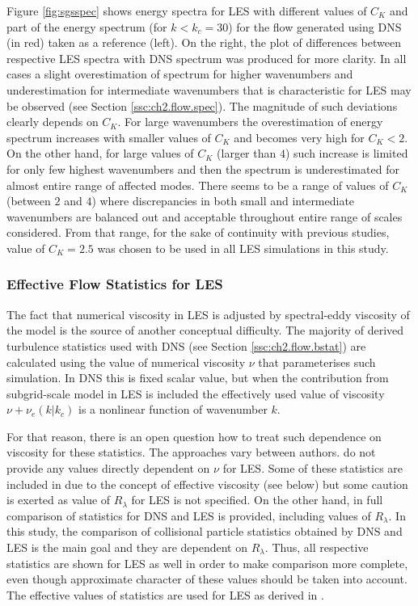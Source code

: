 \documentclass{pracamgren}
\begin{document}
Figure \ref{fig:sgsspec} shows energy spectra for LES with different values of $C_K$ and part of the energy spectrum (for $k < k_c = 30$) for the flow generated using DNS (in red) taken as a reference (left).
On the right, the plot of differences between respective LES spectra with DNS spectrum was produced for more clarity.
In all cases a slight overestimation of spectrum for higher wavenumbers and underestimation for intermediate wavenumbers that is characteristic for LES may be observed (see Section \ref{ssc:ch2.flow.spec}).
The magnitude of such deviations clearly depends on $C_K$.
For large wavenumbers the overestimation of energy spectrum increases with smaller values of $C_K$ and becomes very high for $C_K < 2$.
On the other hand, for large values of $C_K$ (larger than $4$) such increase is limited for only few highest wavenumbers and then the spectrum is underestimated for almost entire range of affected modes.
There seems to be a range of values of $C_K$ (between $2$ and $4$) where discrepancies in both small and intermediate wavenumbers are balanced out and acceptable throughout entire range of scales considered.
From that range, for the sake of continuity with previous studies, value of $C_K=2.5$ was chosen to be used in all LES simulations in this study.


\subsubsection{Effective Flow Statistics for LES}

The fact that numerical viscosity in LES is adjusted by spectral-eddy viscosity of the model is the source of another conceptual difficulty.
The majority of derived turbulence statistics used with DNS (see Section \ref{ssc:ch2.flow.bstat}) are calculated using the value of numerical viscosity $\nu$ that parameterises such simulation.
In DNS this is fixed scalar value, but when the contribution from subgrid-scale model in LES is included the effectively used value of viscosity $\nu + \nu_{e}(k|k_c)$ is a nonlinear function of wavenumber $k$.

For that reason, there is an open question how to treat such dependence on viscosity for these statistics.
The approaches vary between authors.
\textcite[Table 1 therein]{Yang2008} do not provide any values directly dependent on $\nu$ for LES.
Some of these statistics are included in \textcite[Table 1 therein]{Jin2010} due to the concept of effective viscosity (see below) but some caution is exerted as value of $R_{\lambda}$ for LES is not specified.
On the other hand, in \textcite[Table 1 therein]{Rosa2017} full comparison of statistics for DNS and LES is provided, including values of $R_{\lambda}$.
In this study, the comparison of collisional particle statistics obtained by DNS and LES is the main goal and they are dependent on $R_{\lambda}$.
Thus, all respective statistics are shown for LES as well in order to make comparison more complete, even though approximate character of these values should be taken into account.
The effective values of statistics are used for LES as derived in \textcite{Jin2010}.
\end{document}
